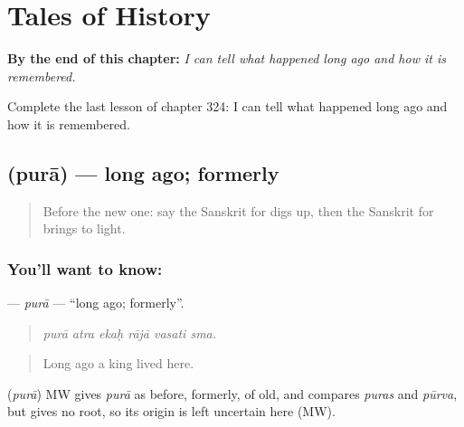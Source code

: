 
\chapter{Tales of History}
\label{ch:sa-tales-of-history}

\begin{chapteropening}
\textbf{By the end of this chapter:} \emph{I can tell what happened long ago and how it is remembered.}

Complete the last lesson of chapter 324: I can tell what happened long ago and how it is remembered.
\end{chapteropening}

\section[\texorpdfstring{\sk{पुरा} (purā)}{पुरा (purā)}]{ (purā) — long ago; formerly}

\label{lesson:SA-C324-pura}



\begin{quote}
Before the new one: say the Sanskrit for digs up, then the Sanskrit for brings to light.
\end{quote}

\subsection*{You'll want to know: }
\textbf{} — \emph{purā} — \textquotedblleft{}long ago; formerly\textquotedblright{}.

\begin{quote}
     
\end{quote}

\begin{quote}
\emph{purā atra ekaḥ rājā vasati sma.}
\end{quote}

\begin{quote}
Long ago a king lived here.
\end{quote}

\begin{cousinweb}
\textbf{} (\emph{purā}) MW gives \emph{purā} as before, formerly, of old, and compares \emph{puras} and \emph{pūrva}, but gives no root, so its origin is left uncertain here (MW).
\end{cousinweb}

